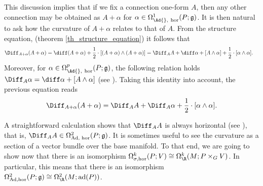 This discussion implies that if we fix a connection one-form \(A\), then any other connection may be obtained as \(A+\alpha\) for \(\alpha \in \Omega^1_{\Ad{}, \ \mathrm{hor}}(P; \mathfrak{g})\). It is then natural to ask how the curvature of \(A+\alpha\) relates to that of \(A\). From the structure equation, (theorem \ref{th_structure_equation}) it follows that 
    \begin{equation*} 
        \begin{split}
    \Diff_{A+\alpha}(A+\alpha)&  = \diff(A+\alpha) + \frac{1}{2}\cdot [(A+\alpha) \wedge  (A+\alpha)] = \Diff_A A + \diff \alpha + [A \wedge \alpha] +\frac{1}{2}\cdot [\alpha \wedge \alpha].
        \end{split}
    \end{equation*}
Moreover, for \(\alpha \in \Omega_{\Ad{}, \ \text{hor}}^p(P; \mathfrak{g})\), the following relation holds \(\Diff_A \alpha=\diff \alpha + [A \wedge \alpha]\) (see \parencite[Remark 1.4.12]{Rudolph_2017pug}). Taking this identity into account, the previous equation reads
    \begin{equation} \label{eq_rel_curvature}
    \Diff_{A+ \alpha}(A+\alpha) = \Diff_AA + \Diff_A \alpha  + \frac{1}{2}\cdot [\alpha \wedge \alpha].
    \end{equation}


A straightforward calculation shows that \(\Diff_A A\) is always horizontal (see \parencite[Page 40]{Rudolph_2017pug}), that is, \(\Diff_A A\in \Omega_{\text{Ad, hor}}^2(P; \mathfrak{g})\). It is sometimes useful to see the curvature as a section of a vector bundle over the base manifold. To that end, we are going to show now that there is an isomorphism \(\Omega^k_{\sigma, \mathrm{hor}}(P;V) \cong \Omega^k_\R(M;P \times _G V)\). In particular, this means that there is an isomorphism \(\Omega^2_{\mathrm{Ad}, \mathrm{hor}}(P;\mathfrak{g}) \cong \Omega^2_\R(M;\mathrm{ad}(P))\).

